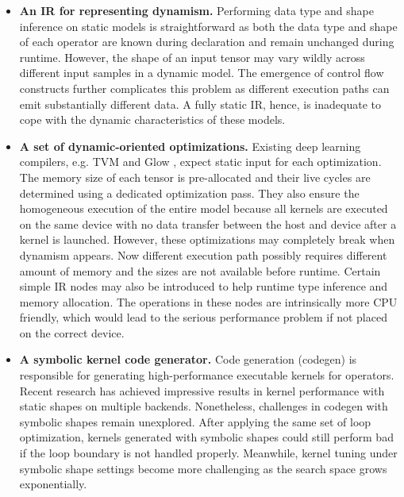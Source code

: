 \begin{itemize}
\item \textbf{An IR for representing dynamism.} Performing data type and shape inference on static models is straightforward as both the data type and shape of each operator are known during declaration and remain unchanged during runtime. However, the shape of an input tensor may vary wildly across different input samples in a dynamic model. The emergence of control flow constructs further complicates this problem as different execution paths can emit substantially different data. A fully static IR, hence, is inadequate to cope with the dynamic characteristics of these models.

\item \textbf{A set of dynamic-oriented optimizations.} Existing deep learning compilers, e.g. TVM \citep{tvm_osdi18} and Glow \citep{glow}, expect static input for each optimization. The memory size of each tensor is pre-allocated and their live cycles are determined using a dedicated optimization pass. They also ensure the homogeneous execution of the entire model because all kernels are executed on the same device with no data transfer between the host and device after a kernel is launched. However, these optimizations may completely break when dynamism appears. Now different execution path possibly requires different amount of memory and the sizes are not available before runtime. Certain simple IR nodes may also be introduced to help runtime type inference and memory allocation. The operations in these nodes are intrinsically more CPU friendly, which would lead to the serious performance problem if not placed on the correct device.

\item \textbf{A symbolic kernel code generator.}
Code generation (codegen) is responsible for generating high-performance executable kernels for operators. Recent research \citep{tvm_osdi18, glow, chen2018learning, zheng2020flextensor, adams2019learning} has achieved impressive results in kernel performance with static shapes on multiple backends.
Nonetheless, challenges in codegen with symbolic shapes remain unexplored.
After applying the same set of loop optimization, kernels generated with symbolic shapes could still perform bad if the loop boundary is not handled properly.
Meanwhile, kernel tuning under symbolic shape settings become more challenging as the search space grows exponentially.


\end{itemize}
